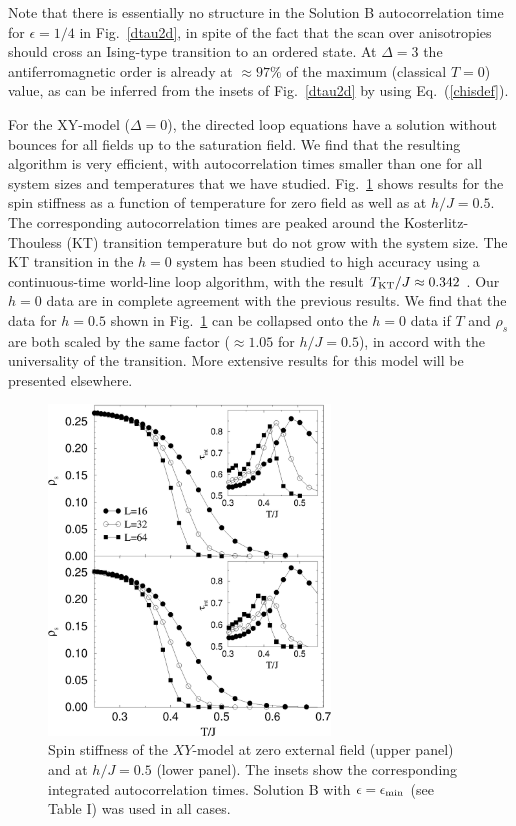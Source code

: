 \documentclass[10pt,pre,aps,twocolumn,showpacs,superscriptaddress,
floatfix]{revtex4}
\begin{document}
Note that there is essentially no structure in the Solution B autocorrelation 
time for $\epsilon=1/4$ in Fig.~\ref{dtau2d}, in spite of the fact that the 
scan over anisotropies should cross an Ising-type transition to an ordered 
state. At $\Delta=3$ the antiferromagnetic order is already at 
$\approx 97\%$ of the maximum (classical $T=0$) value, as can be inferred 
from the insets of Fig.~\ref{dtau2d} by using Eq.~(\ref{chisdef}). 

For the XY-model ($\Delta =0$), the directed loop equations
have a solution without bounces for all fields up to the saturation field.
We find that the resulting algorithm is very efficient, with autocorrelation
times smaller than one for all system sizes and temperatures that we have 
studied. Fig.~\ref{xyrho} shows results for the spin stiffness as
a function of temperature for zero field as well as at $h/J = 0.5$. The
corresponding autocorrelation times are peaked around the Kosterlitz-Thouless
(KT) transition temperature but do not grow with the system size. The
KT transition in the $h=0$ system has been studied to high accuracy using a 
continuous-time world-line loop algorithm, with the result $T_{\rm KT}/J 
\approx 0.342$ \cite{harada}. Our $h=0$ data are in complete agreement with 
the previous results. We find that the data for $h=0.5$ shown in 
Fig.~\ref{xyrho} can be collapsed onto the $h=0$ data if $T$ and 
$\rho_s$ are both scaled by the same factor ($\approx 1.05$ for $h/J=0.5$), 
in accord with the universality of the transition. More extensive results 
for this model will be presented elsewhere.

\begin{figure}
\includegraphics[clip,width=7.5cm]{fig22.eps}
\caption{Spin stiffness of the $XY$-model at zero external field (upper panel)
and at $h/J=0.5$ (lower panel). The insets show the corresponding integrated 
autocorrelation times. Solution B with $\epsilon=\epsilon_{\rm min}$ (see
Table I) was used in all cases.}
\label{xyrho}
\end{figure}
\end{document}
